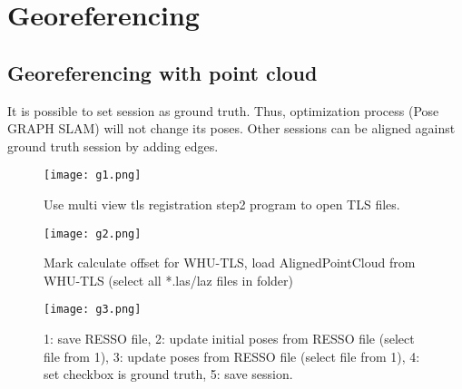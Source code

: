 \chapter{Georeferencing}
\section{Georeferencing with point cloud}

It is possible to set session as ground truth.
Thus, optimization process (Pose GRAPH SLAM) will not change its poses.
Other sessions can be aligned against ground truth session by adding edges.

\begin{figure}[H]
	\centering
	\texttt{[image: g1.png]}
	\caption{Use multi view tls registration step2 program to open TLS files.}
	\label{fig:g1}
\end{figure}

\begin{figure}[H]
	\centering
	\texttt{[image: g2.png]}
	\caption{Mark calculate offset for WHU-TLS, load AlignedPointCloud from WHU-TLS (select all *.las/laz files in folder)}
	\label{fig:g2}
\end{figure}

\begin{figure}[H]
	\centering
	\texttt{[image: g3.png]}
	\caption{1: save RESSO file, 2: update initial poses from RESSO file (select file from 1), 3: update poses from RESSO file (select file from 1), 4: set checkbox is ground truth, 5: save session.}
	\label{fig:g3}
\end{figure}